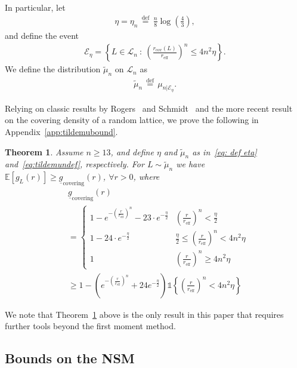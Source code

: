 \documentclass[article,doublecolumn]{IEEEtran}
\newcommand{\LL}{{\mathcal L}}
\newcommand{\df}{{\, \stackrel{\mathrm{def}}{=}\, }}
\newcommand{\Ind}{\mathds{1}}
\newcommand{\rcov}{{r_{\mathrm{cov}}}}
\newcommand{\reff}{{r_{\mathrm{eff}}}}
\newcommand{\VcdfL}{g_L}
\newcommand{\LBco}{\underline{g}_{\mathrm{covering}}}
\newtheorem{thm}{Theorem}[section]
\begin{document}
In particular, let
\begin{align}
\eta = \eta_n \df \frac{n}{8} \log \left( \frac{4}{3} \right),
\label{eq: def eta}
\end{align}
and define the event
\begin{align}
\mathcal{E}_{\eta}=\left\{L\in\LL_n~:~\left(\frac{\rcov(L)}{\reff}\right)^n\leq 4 n^2 \eta\right\}.    
\end{align}
We define the distribution $\tilde{\mu}_n$ on $\LL_n$ as
\begin{align}
\tilde{\mu}_n\df \mu_{n|\mathcal{E}_\eta}.  
\label{eq:tildemundef}
\end{align}


Relying on classic results by Rogers~\cite{Rogers_bound} and Schmidt~\cite{Schmidt-admissible} and the more recent result~\cite{ORW21} on the covering density of a random lattice, we prove the following in Appendix~\ref{app:tildemubound}.

\begin{thm}
Assume $n\geq 13$, and define $\eta$ and $\tilde{\mu}_n$ as in~\eqref{eq: def eta} and~\eqref{eq:tildemundef}, respectively. For $L\sim\tilde{\mu}_n$ we have $\mathbb{E}[\VcdfL(r)]\geq \LBco(r)$, $\forall r>0$, where
\begin{align*}
 &\LBco(r)\nonumber\\
 &=\begin{cases}
 1-e^{-\left(\frac{r}{\reff} \right)^n}- 23 \cdot e^{-\frac{\eta}{2}} & \left(\frac{r}{\reff} \right)^n<\frac{\eta}{2}\\
 1- 24 \cdot e^{-\frac{\eta}{2}} & \frac{\eta}{2}\leq \left(\frac{r}{\reff} \right)^n< 4n^2\eta\\
 1 & \left(\frac{r}{\reff} \right)^n \geq 4n^2\eta
 \end{cases}\\
 &\geq 1- \left(e^{-\left(\frac{r}{\reff} \right)^n}+24e^{-\frac{\eta}{2}}\right)\Ind\left\{\left(\frac{r}{\reff}\right)^n<4n^2\eta\right\}
\end{align*}
\label{thm:gcovbound}
\end{thm}

We note that Theorem~\ref{thm:gcovbound} above is the only result in this paper that requires further tools beyond the first moment method.


\subsection{Bounds on the NSM}
\end{document}
